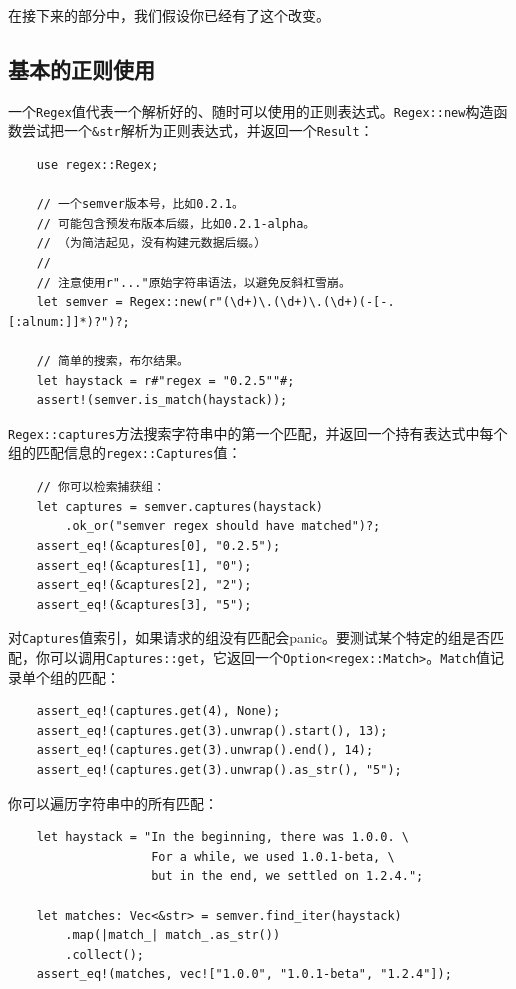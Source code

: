 在接下来的部分中，我们假设你已经有了这个改变。

\subsection{基本的正则使用}

一个\texttt{Regex}值代表一个解析好的、随时可以使用的正则表达式。\texttt{Regex::new}构造函数尝试把一个\texttt{\&str}解析为正则表达式，并返回一个\texttt{Result}：
\begin{verbatim}
    use regex::Regex;

    // 一个semver版本号，比如0.2.1。
    // 可能包含预发布版本后缀，比如0.2.1-alpha。
    // （为简洁起见，没有构建元数据后缀。）
    //
    // 注意使用r"..."原始字符串语法，以避免反斜杠雪崩。
    let semver = Regex::new(r"(\d+)\.(\d+)\.(\d+)(-[-.[:alnum:]]*)?")?;

    // 简单的搜索，布尔结果。
    let haystack = r#"regex = "0.2.5""#;
    assert!(semver.is_match(haystack));
\end{verbatim}

\texttt{Regex::captures}方法搜索字符串中的第一个匹配，并返回一个持有表达式中每个组的匹配信息的\texttt{regex::Captures}值：
\begin{verbatim}
    // 你可以检索捕获组：
    let captures = semver.captures(haystack)
        .ok_or("semver regex should have matched")?;
    assert_eq!(&captures[0], "0.2.5");
    assert_eq!(&captures[1], "0");
    assert_eq!(&captures[2], "2");
    assert_eq!(&captures[3], "5");
\end{verbatim}

对\texttt{Captures}值索引，如果请求的组没有匹配会panic。要测试某个特定的组是否匹配，你可以调用\texttt{Captures::get}，它返回一个\texttt{Option<regex::Match>}。\texttt{Match}值记录单个组的匹配：
\begin{verbatim}
    assert_eq!(captures.get(4), None);
    assert_eq!(captures.get(3).unwrap().start(), 13);
    assert_eq!(captures.get(3).unwrap().end(), 14);
    assert_eq!(captures.get(3).unwrap().as_str(), "5");
\end{verbatim}

你可以遍历字符串中的所有匹配：
\begin{verbatim}
    let haystack = "In the beginning, there was 1.0.0. \
                    For a while, we used 1.0.1-beta, \
                    but in the end, we settled on 1.2.4.";

    let matches: Vec<&str> = semver.find_iter(haystack)
        .map(|match_| match_.as_str())
        .collect();
    assert_eq!(matches, vec!["1.0.0", "1.0.1-beta", "1.2.4"]);
\end{verbatim}

